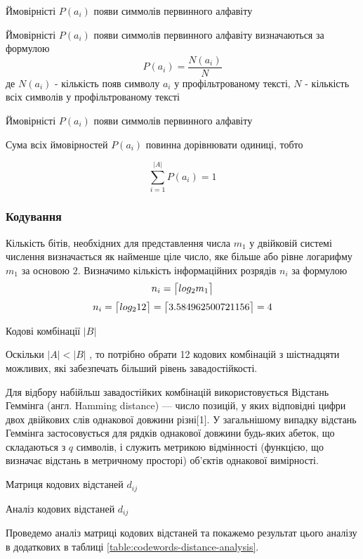 \documentclass[a4paper,14pt]{extreport}
\DeclarePairedDelimiter{\ceil}{\lceil}{\rceil}
\begin{document}
 \begin{table}[H]
 	\caption{Ймовірністі $P(a_i)$ появи симмолів первинного алфавіту}
 	\centering
 	\resizebox{\columnwidth}{!}{%
 	
 	}
 \end{table}
  

Ймовірністі $P(a_i)$ появи симмолів первинного алфавіту визначаються за формулою
$$ P(a_i) = \frac{N(a_i)}{N}$$
де $N(a_i)$ - кількість появ символу $a_i$ у профільтрованому тексті, $N$ - кількість всіх символів у профільтрованому тексті

\begin{table}[H]
	\caption{Ймовірністі $P(a_i)$ появи симмолів первинного алфавіту}
	\centering
	\resizebox{\columnwidth}{!}{%
		
	}
\end{table}

 

 
Сума всіх ймовірностей $P(a_i)$ повинна дорівнювати одиниці, тобто
 
 $$ \sum_{i=1}^{|A|} P(a_i) = 1 $$

\subsubsection[Кодування]{Кодування}

Кількість бітів, необхідних для представлення числа $m_1$ у двійковій системі числення визначається як найменше ціле число, яке більше або рівне логарифму $m_1$ за основою $2$.
Визначимо кількість інформаційних розрядів $n_i $ за формулою 
$$n_i =\ceil[\big]{log_2 m_1} $$
$$n_i =\ceil[\big]{log_2 12}   =\ceil[\big]{3.584962500721156} = 4  $$
\begin{table}[H]
	\caption{Кодові комбінації $|B|$}
	\centering
	
\end{table}
Оскільки $|A| < |B|$ , то потрібно обрати 12 кодових комбінацій з шістнадцяти
можливих, які забезпечать більший рівень завадостійкості.

Для відбору набійльш завадостійких комбінацій використовується 
Відстань Геммінга (англ. Hamming distance)  — число позицій, у яких відповідні цифри двох двійкових слів однакової довжини різні[1]. У загальнішому випадку відстань Геммінга застосовується для рядків однакової довжини будь-яких абеток, що складаються з $q$ символів, і служить метрикою відмінності (функцією, що визначає відстань в метричному просторі) об'єктів однакової вимірності. 

\begin{table}[H]
	\caption{Матриця кодових відстаней $d_{ij}$}
	\centering
		\resizebox{\columnwidth}{!}{%
		
	}
\end{table}
\begin{table}[H]
	\caption{Аналіз кодових відстаней $d_{ij}$}
	\centering
	
	\label{table:codewords-distance-analysis}
\end{table}
Проведемо аналіз матриці кодових відстаней та покажемо результат цього
аналізу в додаткових в таблиці \ref{table:codewords-distance-analysis}.
\end{document}
